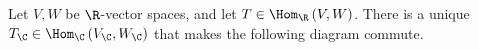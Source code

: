 \documentclass[10pt]{mypackage}
\begin{document}
\begin{proposition}
  Let $V,W$ be $\R$-vector spaces, and let $T\in \Hom_{\R}\left(V,W\right)$. There is a unique $T_{\C}\in \Hom_{\C}\left(V_{\C},W_{\C}\right)$ that makes the following diagram commute.
\begin{center}
\end{center}
\end{proposition}
\end{document}
